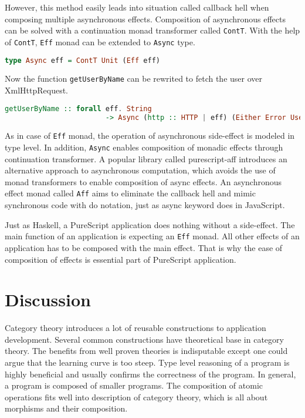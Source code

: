 \documentclass[article]{aaltoseries}
\begin{document}
      However, this method easily leads into situation called callback hell when
      composing multiple asynchronous effects. Composition of asynchronous
      effects can be solved with a continuation monad transformer called
      \lstinline|ContT|. With the help of \lstinline|ContT|, \lstinline|Eff|
      monad can be extended to \lstinline|Async| type.
 
      \begin{lstlisting}[language=Haskell]
        type Async eff = ContT Unit (Eff eff)
      \end{lstlisting}

      Now the function \lstinline|getUserByName| can be rewrited to fetch the
      user over XmlHttpRequest.

      \begin{lstlisting}[language=Haskell]
        getUserByName :: forall eff. String 
                        -> Async (http :: HTTP | eff) (Either Error User)
      \end{lstlisting}
 
      As in case of \lstinline|Eff| monad, the operation of asynchronous
      side-effect is modeled in type level. In addition, \lstinline|Async|
      enables composition of monadic effects through continuation transformer. A
      popular library called purescript-aff introduces an alternative approach
      to asynchronous computation, which avoids the use of monad transformers to
      enable composition of async effects. An asynchronous effect monad called
      \lstinline|Aff| aims to eliminate the callback hell and mimic synchronous
      code with do notation, just as async keyword does in JavaScript.
 
      Just as Haskell, a PureScript application does nothing without a
      side-effect. The main function of an application is expecting an
      \lstinline|Eff| monad. All other effects of an application has to be
      composed with the main effect. That is why the ease of composition of
      effects is essential part of PureScript application.


\section{Discussion}

Category theory introduces a lot of reusable constructions to application
development. Several common constructions have theoretical base in category
theory. The benefits from well proven theories is indisputable except one could
argue that the learning curve is too steep. Type level reasoning of a program is
highly beneficial and usually confirms the correctness of the program. In
general, a program is composed of smaller programs. The composition of atomic
operations fits well into description of category theory, which is all about
morphisms and their composition.
 
\end{document}
